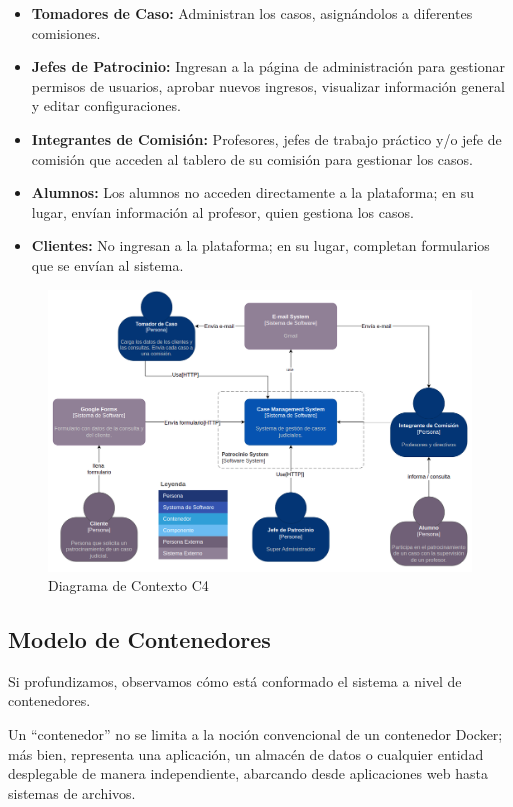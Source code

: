 \begin{itemize}
    \item \textbf{Tomadores de Caso:} Administran los casos, asignándolos a diferentes comisiones.
    \item \textbf{Jefes de Patrocinio:} Ingresan a la página de administración para gestionar permisos de usuarios, aprobar nuevos ingresos, visualizar información general y editar configuraciones.
    \item \textbf{Integrantes de Comisión:} Profesores, jefes de trabajo práctico y/o jefe de comisión que acceden al tablero de su comisión para gestionar los casos.
    \item \textbf{Alumnos:} Los alumnos no acceden directamente a la plataforma; en su lugar, envían información al profesor, quien gestiona los casos.
    \item \textbf{Clientes:} No ingresan a la plataforma; en su lugar, completan formularios que se envían al sistema.
\end{itemize}

\begin{figure}[H]
    \centering
    \includegraphics[width=1.1\linewidth]{fig/c4-1.png}
    \caption{Diagrama de Contexto C4}
    \label{fig:c4-01}
\end{figure}



\subsection{Modelo de Contenedores}
Si profundizamos, observamos cómo está conformado el sistema a nivel de contenedores.

Un ``contenedor'' no se limita a la noción convencional de un contenedor Docker; más bien, representa una aplicación, un almacén de datos o cualquier entidad desplegable de manera independiente, abarcando desde aplicaciones web hasta sistemas de archivos.

